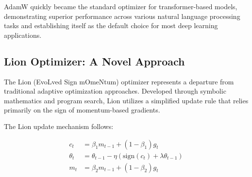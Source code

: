 AdamW quickly became the standard optimizer for transformer-based models, demonstrating superior performance across various natural language processing tasks and establishing itself as the default choice for most deep learning applications.

\subsection{Lion Optimizer: A Novel Approach}

The Lion (EvoLved Sign mOmeNtum) optimizer \cite{chen2023symbolic} represents a departure from traditional adaptive optimization approaches. Developed through symbolic mathematics and program search, Lion utilizes a simplified update rule that relies primarily on the sign of momentum-based gradients.

The Lion update mechanism follows:

\begin{align}
c_t &= \beta_1 m_{t-1} + (1 - \beta_1) g_t \\
\theta_t &= \theta_{t-1} - \eta \left( \text{sign}(c_t) + \lambda \theta_{t-1} \right) \\
m_t &= \beta_2 m_{t-1} + (1 - \beta_2) g_t
\end{align}




